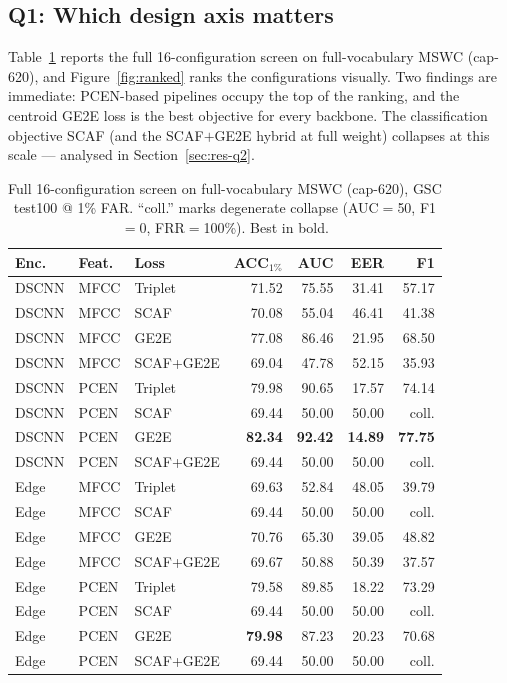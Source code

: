 \documentclass[12pt,a4paper]{article}
\begin{document}
\subsection{Q1: Which design axis matters}\label{sec:res-q1}

Table~\ref{tab:matrix} reports the full 16-configuration screen on full-vocabulary
MSWC (cap-620), and Figure~\ref{fig:ranked} ranks the configurations visually. Two
findings are immediate: PCEN-based pipelines occupy the top of the ranking, and
the centroid GE2E loss is the best objective for every backbone. The
classification objective SCAF (and the SCAF$+$GE2E hybrid at full weight)
collapses at this scale --- analysed in Section~\ref{sec:res-q2}.

\begin{table}[t]
\centering
\caption{Full 16-configuration screen on full-vocabulary MSWC (cap-620), GSC
test100 @ 1\% FAR. ``coll.'' marks degenerate collapse (AUC$=$50, F1$=$0,
FRR$=$100\%). Best in bold.}
\label{tab:matrix}
\small
\setlength{\tabcolsep}{5pt}
\begin{tabular}{lll r r r r}
\toprule
\textbf{Enc.} & \textbf{Feat.} & \textbf{Loss} &
ACC$_{1\%}$ & AUC & EER & F1\\
\midrule
DSCNN & MFCC & Triplet     & 71.52 & 75.55 & 31.41 & 57.17 \\
DSCNN & MFCC & SCAF        & 70.08 & 55.04 & 46.41 & 41.38 \\
DSCNN & MFCC & GE2E        & 77.08 & 86.46 & 21.95 & 68.50 \\
DSCNN & MFCC & SCAF+GE2E   & 69.04 & 47.78 & 52.15 & 35.93 \\
DSCNN & PCEN & Triplet     & 79.98 & 90.65 & 17.57 & 74.14 \\
DSCNN & PCEN & SCAF        & 69.44 & 50.00 & 50.00 & coll. \\
\rowcolor{blue!7}
DSCNN & PCEN & GE2E        & \textbf{82.34} & \textbf{92.42} & \textbf{14.89} & \textbf{77.75} \\
DSCNN & PCEN & SCAF+GE2E   & 69.44 & 50.00 & 50.00 & coll. \\
Edge  & MFCC & Triplet     & 69.63 & 52.84 & 48.05 & 39.79 \\
Edge  & MFCC & SCAF        & 69.44 & 50.00 & 50.00 & coll. \\
Edge  & MFCC & GE2E        & 70.76 & 65.30 & 39.05 & 48.82 \\
Edge  & MFCC & SCAF+GE2E   & 69.67 & 50.88 & 50.39 & 37.57 \\
Edge  & PCEN & Triplet     & 79.58 & 89.85 & 18.22 & 73.29 \\
Edge  & PCEN & SCAF        & 69.44 & 50.00 & 50.00 & coll. \\
\rowcolor{blue!7}
Edge  & PCEN & GE2E        & \textbf{79.98} & 87.23 & 20.23 & 70.68 \\
Edge  & PCEN & SCAF+GE2E   & 69.44 & 50.00 & 50.00 & coll. \\
\bottomrule
\end{tabular}
\end{table}
\end{document}
